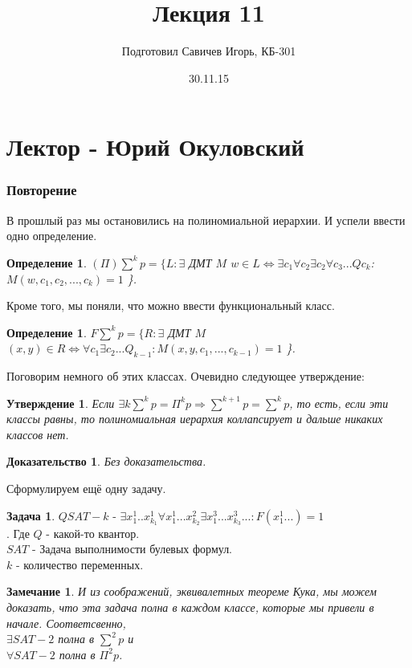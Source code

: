 \documentclass{beamer}
\title{Лекция 11}
\author{Подготовил Савичев Игорь, КБ-301}
\theoremstyle{plain}
\newtheorem{state}[thm]{Утверждение}
\newtheorem{rmk}[thm]{Замечание}
\newtheorem{proof-rus}[thm]{Доказательство}
\newtheorem{dfn}[thm]{Определение}
\theoremstyle{definition}
\newtheorem{prob-rus}[thm]{Задача}
\begin{document}
\date{30.11.15}



\section{Лектор - Юрий Окуловский}
\begin{frame}
    \frametitle{Повторение}
    В прошлый раз мы остановились на полиномиальной иерархии.
    И успели ввести одно определение.
    \begin{dfn}
        $(\Pi)\sum^kp = \{L: \exists$ ДМТ $M$ $w \in L
        \Leftrightarrow \exists c_1 \forall c_2 \exists c_2
        \forall c_3 ... Qc_k$: $M(w, c_1, c_2, ..., c_k) = 1$ \}.
    \end{dfn}
    Кроме того, мы поняли, что можно ввести функциональный класс.
    \begin{dfn}
        $F\sum^kp = \{R: \exists$ ДМТ $M$ $(x,y)\in R
        \Leftrightarrow \forall c_1 \exists c_2 ... Q_{k-1}:
         M(x, y, c_1, ..., c_{k-1}) = 1$ \}.
    \end{dfn}
\end{frame}

\begin{frame}
    Поговорим немного об этих классах.
    Очевидно следующее утверждение:
    \begin{state}
        Если $\exists k \sum^kp = \Pi^kp \Rightarrow \sum^{k+1}p = \sum^kp$, то есть, если эти классы равны, то полиномиальная иерархия коллапсирует
        и дальше никаких классов нет.
    \end{state}
    \begin{proof-rus}
        Без доказательства.
    \end{proof-rus}
\end{frame}

\begin{frame}
    Сформулируем ещё одну задачу.
    \begin{prob-rus}
        $QSAT-k$ - $\exists x_1^1 .. x_{k_1}^1 \forall x_1^1 ... x_{k_2}^2 \exists x_1^3 ... x_{k_3}^3 ... : F(x_1^1...) = 1$ \\.
        Где $Q$ - какой-то квантор. \\
        $SAT$ - Задача выполнимости булевых формул.\\
        $k$ - количество переменных.
    \end{prob-rus}
    \begin{rmk}
        И из соображений, эквивалетных теореме Кука, мы можем доказать, что эта
        задача полна в каждом классе, которые мы привели в начале.
        Соответсвенно, \\
        $\exists SAT-2$ полна в $\sum^2p$ и \\
        $\forall SAT-2$ полна в $\Pi^2p$.
    \end{rmk}
\end{frame}
\end{document}
